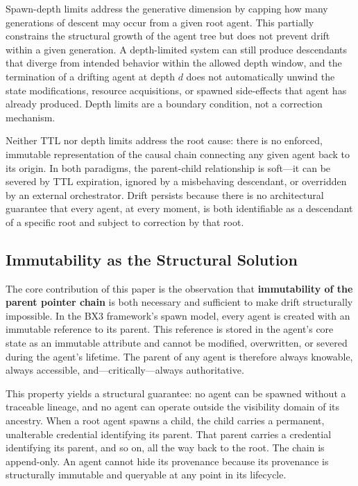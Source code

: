 Spawn-depth limits address the generative dimension by capping how many generations of descent may occur from a given root agent. This partially constrains the structural growth of the agent tree but does not prevent drift within a given generation. A depth-limited system can still produce descendants that diverge from intended behavior within the allowed depth window, and the termination of a drifting agent at depth $d$ does not automatically unwind the state modifications, resource acquisitions, or spawned side-effects that agent has already produced. Depth limits are a boundary condition, not a correction mechanism.

Neither TTL nor depth limits address the root cause: there is no enforced, immutable representation of the causal chain connecting any given agent back to its origin. In both paradigms, the parent-child relationship is soft—it can be severed by TTL expiration, ignored by a misbehaving descendant, or overridden by an external orchestrator. Drift persists because there is no architectural guarantee that every agent, at every moment, is both identifiable as a descendant of a specific root and subject to correction by that root.

\subsection{Immutability as the Structural Solution}

The core contribution of this paper is the observation that \textbf{immutability of the parent pointer chain} is both necessary and sufficient to make drift structurally impossible. In the BX3 framework's spawn model, every agent is created with an immutable reference to its parent. This reference is stored in the agent's core state as an immutable attribute and cannot be modified, overwritten, or severed during the agent's lifetime. The parent of any agent is therefore always knowable, always accessible, and—critically—always authoritative.

This property yields a structural guarantee: no agent can be spawned without a traceable lineage, and no agent can operate outside the visibility domain of its ancestry. When a root agent spawns a child, the child carries a permanent, unalterable credential identifying its parent. That parent carries a credential identifying its parent, and so on, all the way back to the root. The chain is append-only. An agent cannot hide its provenance because its provenance is structurally immutable and queryable at any point in its lifecycle.

